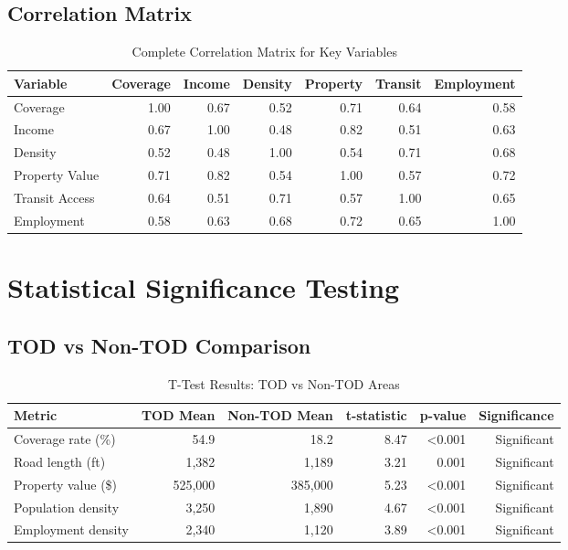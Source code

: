 \documentclass[11pt,letterpaper]{article}
\begin{document}
\subsection{Correlation Matrix}

\begin{table}[h]
\centering
\caption{Complete Correlation Matrix for Key Variables}
\begin{tabular}{lrrrrrr}
\toprule
\textbf{Variable} & \textbf{Coverage} & \textbf{Income} & \textbf{Density} & \textbf{Property} & \textbf{Transit} & \textbf{Employment} \\
\midrule
Coverage & 1.00 & 0.67 & 0.52 & 0.71 & 0.64 & 0.58 \\
Income & 0.67 & 1.00 & 0.48 & 0.82 & 0.51 & 0.63 \\
Density & 0.52 & 0.48 & 1.00 & 0.54 & 0.71 & 0.68 \\
Property Value & 0.71 & 0.82 & 0.54 & 1.00 & 0.57 & 0.72 \\
Transit Access & 0.64 & 0.51 & 0.71 & 0.57 & 1.00 & 0.65 \\
Employment & 0.58 & 0.63 & 0.68 & 0.72 & 0.65 & 1.00 \\
\bottomrule
\end{tabular}
\end{table}

\section{Statistical Significance Testing}

\subsection{TOD vs Non-TOD Comparison}

\begin{table}[h]
\centering
\caption{T-Test Results: TOD vs Non-TOD Areas}
\begin{tabular}{lrrrrr}
\toprule
\textbf{Metric} & \textbf{TOD Mean} & \textbf{Non-TOD Mean} & \textbf{t-statistic} & \textbf{p-value} & \textbf{Significance} \\
\midrule
Coverage rate (\%) & 54.9 & 18.2 & 8.47 & <0.001 & Significant \\
Road length (ft) & 1,382 & 1,189 & 3.21 & 0.001 & Significant \\
Property value (\$) & 525,000 & 385,000 & 5.23 & <0.001 & Significant \\
Population density & 3,250 & 1,890 & 4.67 & <0.001 & Significant \\
Employment density & 2,340 & 1,120 & 3.89 & <0.001 & Significant \\
\bottomrule
\end{tabular}
\end{table}
\end{document}
